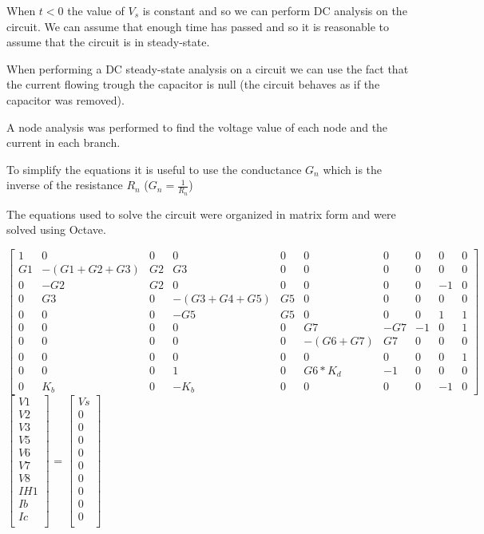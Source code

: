 When $t<0$ the value of $V_s$ is constant and so we can perform DC analysis on the circuit. We can assume that enough time has passed and so it is reasonable to assume that the circuit is in steady-state.

When performing a DC steady-state analysis on a circuit we can use the fact that the current flowing trough the capacitor is null (the circuit behaves as if the capacitor was removed).

A node analysis was performed to find the voltage value of each node and the current in each branch.


To simplify the equations it is useful to use the conductance $G_n$ which is the inverse of the resistance $R_n$ 
($G_n=\frac{1}{R_n}$)

The equations used to solve the circuit were organized in matrix form and were solved using Octave.

{\footnotesize

$ \begin{bmatrix}
1 & 0 & 0 & 0 & 0 & 0 & 0 & 0 & 0 & 0 \\
G1 & -(G1+G2+G3) & G2 & G3 & 0 & 0 & 0 & 0 & 0 & 0 \\
0 & -G2 & G2 & 0 & 0 & 0 & 0 & 0 & -1 & 0 \\
0 & G3 & 0 & -(G3+G4+G5) & G5 & 0 & 0 & 0 & 0 & 0 \\
0 & 0 & 0 & -G5 & G5 & 0 & 0 & 0 & 1 & 1 \\
0 & 0 & 0 & 0 & 0 & G7 & -G7 & -1 & 0 & 1 \\
0 & 0 & 0 & 0 & 0 & -(G6+G7) & G7 & 0 & 0 & 0 \\
0 & 0 & 0 & 0 & 0 & 0 & 0 & 0 & 0 & 1 \\
0 & 0 & 0 & 1 & 0 & G6*K_d & -1 & 0 & 0 & 0 \\
0 & K_b & 0 & -K_b & 0 & 0 & 0 & 0 & -1 & 0 
\end{bmatrix}  $
$ \begin{bmatrix}
V1 \\
V2 \\
V3 \\
V5 \\
V6 \\
V7 \\
V8 \\
IH1 \\
Ib \\
Ic \\
\end{bmatrix}  $
=
$ \begin{bmatrix}
Vs\\
0\\
0\\
0\\
0\\
0\\
0\\
0\\
0\\
0\\
\end{bmatrix}  $
}

